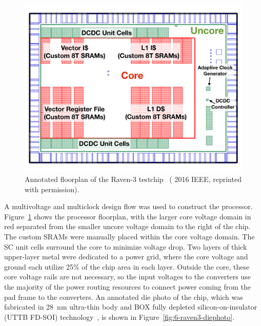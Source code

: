 \documentclass[graybox]{svmult}
\begin{document}
\begin{figure}
  \centering
  \includegraphics[width=\textwidth]{6-raven3-floorplan}
  \caption{Annotated floorplan of the Raven-3 testchip~\cite{Zimmer2016} ({\textcopyright} 2016 IEEE, reprinted with permission).}
  \label{fig:6-raven3-floorplan}
\end{figure}

A multivoltage and multiclock design flow was used to construct the processor.
Figure~\ref{fig:6-raven3-floorplan} shows the processor floorplan, with the larger core voltage domain in red separated from the smaller uncore voltage domain to the right of the chip.
The custom SRAMs were manually placed within the core voltage domain.
The SC unit cells surround the core to minimize voltage drop.
Two layers of thick upper-layer metal were dedicated to a power grid, where the core voltage and ground each utilize 25\% of the chip area in each layer.
Outside the core, these core voltage rails are not necessary, so the input voltages to the converters use the majority of the power routing resources to connect power coming from the pad frame to the converters.
An annotated die photo of the chip, which was fabricated in \SI{28}{\nano\meter} ultra-thin body and BOX fully depleted silicon-on-insulator (UTTB FD-SOI) technology~\cite{Flatresse2013}, is shown in Figure~\ref{fig:6-raven3-diephoto}.
\end{document}
